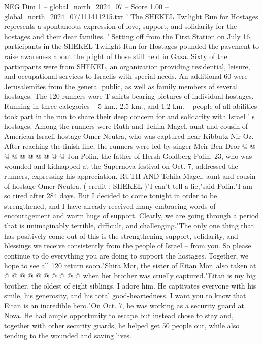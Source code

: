 \begin{textsample}{NEG Dim 1 – global\_north\_2024\_07 – Score 1.00 – global\_north\_2024\_07/111411215.txt}  \label{ex:f1_neg_276}
' The SHEKEL Twilight Run for Hostages represents a spontaneous expression of love, support, and solidarity for the hostages and their dear families. ' Setting off from the First Station on July 16, participants in the SHEKEL Twilight Run for Hostages pounded the pavement to raise awareness about the plight of those still held in Gaza.
Sixty of the participants were from SHEKEL, an organization providing residential, leisure, and occupational services to Israelis with special needs.
An additional 60 were Jerusalemites from the general public, as well as family members of several hostages.
The 120 runners wore T-shirts bearing pictures of individual hostages.
Running in three categories -- 5 km., 2.5 km., and 1.2 km. -- people of all abilities took part in the run to share their deep concern for and solidarity with Israel ' s hostages.
Among the runners were Ruth and Tehila Magel, aunt and cousin of American-Israeli hostage Omer Neutra, who was captured near Kibbutz Nir Oz.
After reaching the finish line, the runners were led by singer Meir Ben Dror @ @ @ @ @ @ @ @ @ @ Jon Polin, the father of Hersh Goldberg-Polin, 23, who was wounded and kidnapped at the Supernova festival on Oct. 7, addressed the runners, expressing his appreciation.
RUTH AND Tehila Magel, aunt and cousin of hostage Omer Neutra. ( credit : SHEKEL )"I can't tell a lie,"said Polin."I am so tired after 284 days.
But I decided to come tonight in order to be strengthened, and I have already received many embracing words of encouragement and warm hugs of support.
Clearly, we are going through a period that is unimaginably terrible, difficult, and challenging."The only one thing that has positively come out of this is the strengthening support, solidarity, and blessings we receive consistently from the people of Israel -- from you.
So please continue to do everything you are doing to support the hostages.
Together, we hope to see all 120 return soon."Shira Mor, the sister of Eitan Mor, also taken at @ @ @ @ @ @ @ @ @ @ when her brother was cruelly captured."Eitan is my big brother, the oldest of eight siblings.
I adore him.
He captivates everyone with his smile, his generosity, and his total good-heartedness.
I want you to know that Eitan is an incredible hero."On Oct. 7, he was working as a security guard at Nova.
He had ample opportunity to escape but instead chose to stay and, together with other security guards, he helped get 50 people out, while also tending to the wounded and saving lives.

\end{textsample}
